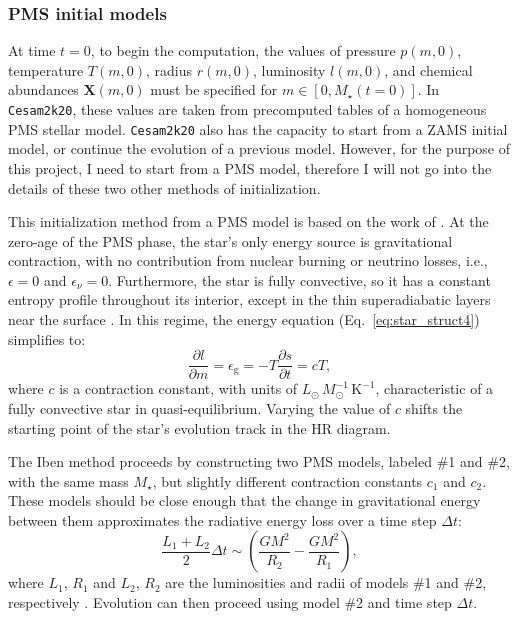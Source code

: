 \documentclass[12pt,a4paper]{article}
\newcommand{\mr}{\mathrm}
\newcommand{\pfird}[2][]{\frac{\partial#1}{\partial#2}}
\newcommand{\bvec}[1]{\boldsymbol{#1}}
\begin{document}
\subsubsection{PMS initial models}
\label{sec:pms_initial_models}

At time $t = 0$, to begin the computation, the values of pressure $p(m, 0)$, temperature $T(m, 0)$, radius $r(m, 0)$, luminosity $l(m, 0)$, and chemical abundances $\bvec{X}(m, 0)$ must be specified for $m \in [0, M_\star(t=0)]$. In \texttt{Cesam2k20}, these values are taken from precomputed tables of a homogeneous PMS stellar model. \texttt{Cesam2k20} also has the capacity to start from a ZAMS initial model, or continue the evolution of a previous model. However, for the purpose of this project, I need to start from a PMS model, therefore I will not go into the details of these two other methods of initialization. 

This initialization method from a PMS model is based on the work of \textcite{Iben1965a}. At the zero-age of the PMS phase, the star's only energy source is gravitational contraction, with no contribution from nuclear burning or neutrino losses, i.e., $\epsilon = 0$ and $\epsilon_\nu = 0$. Furthermore, the star is fully convective, so it has a constant entropy profile throughout its interior, except in the thin superadiabatic layers near the surface \parencite{Iben1965a}. In this regime, the energy equation (Eq.~\eqref{eq:star_struct4}) simplifies to:
\begin{equation}
  \pfird[l]{m} = \epsilon_\mr{g} = -T\pfird[s]{t} = cT,
\end{equation}
where $c$ is a contraction constant, with units of $L_\odot\,M_\odot^{-1}\,\mr{K}^{-1}$, characteristic of a fully convective star in quasi-equilibrium. Varying the value of $c$ shifts the starting point of the star's evolution track in the HR diagram.

The Iben method proceeds by constructing two PMS models, labeled \#1 and \#2, with the same mass $M_\star$, but slightly different contraction constants $c_1$ and $c_2$. These models should be close enough that the change in gravitational energy between them approximates the radiative energy loss over a time step $\Delta t$:
\begin{equation}
  \frac{L_1 + L_2}{2}\Delta t \sim \left(\frac{GM^2}{R_2} - \frac{GM^2}{R_1}\right),
\end{equation}
where $L_1$, $R_1$ and $L_2$, $R_2$ are the luminosities and radii of models \#1 and \#2, respectively \parencite[cf. Eq.~(13)][]{Morel1997}. Evolution can then proceed using model \#2 and time step $\Delta t$.
\end{document}
